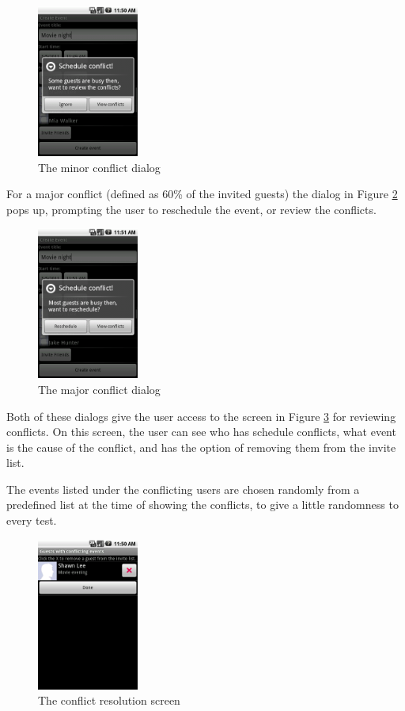 \documentclass[a4paper,11pt]{report}
\begin{document}
\begin{figure}[htb]
  \centering
  \includegraphics[height=50mm]{minor}
  \caption{The minor conflict dialog}
  \label{fig:minor}
\end{figure}

For a major conflict (defined as 60\% of the invited guests) the dialog in
Figure \ref{fig:major} pops up, prompting the user to reschedule the event, or
review the conflicts.

\begin{figure}[htb]
  \centering
  \includegraphics[height=50mm]{major}
  \caption{The major conflict dialog}
  \label{fig:major}
\end{figure}

Both of these dialogs give the user access to the screen in Figure
\ref{fig:resolve} for reviewing conflicts. On this screen, the user can see who
has schedule conflicts, what event is the cause of the conflict, and has the
option of removing them from the invite list.

The events listed under the conflicting users are chosen randomly from a
predefined list at the time of showing the conflicts, to give a little
randomness to every test.

\begin{figure}[htb]
  \centering
  \includegraphics[height=50mm]{resolution}
  \caption{The conflict resolution screen}
  \label{fig:resolve}
\end{figure}
\end{document}

